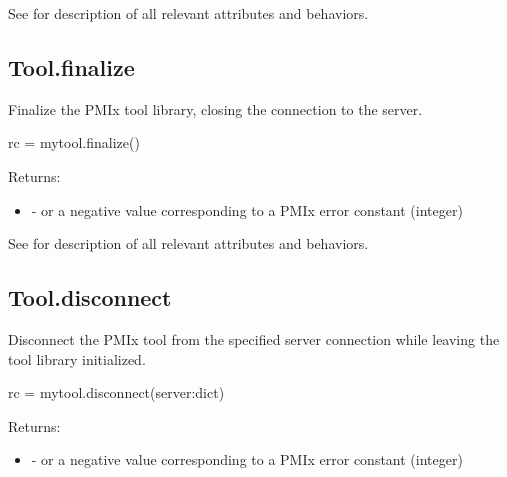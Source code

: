 See  for description of all relevant attributes and behaviors.


\subsection{Tool.finalize}

\summary

Finalize the PMIx tool library, closing the connection to the server.

\format

\pyspecificstart
\begin{codepar}
rc = mytool.finalize()
\end{codepar}
\pyspecificend


Returns:

\begin{itemize}
    \item {} -  or a negative value corresponding to a PMIx error constant (integer)
\end{itemize}


See  for description of all relevant attributes and behaviors.


\subsection{Tool.disconnect}

\summary

Disconnect the \ac{PMIx} tool from the specified server connection while leaving the tool library initialized.

\format

\pyspecificstart
\begin{codepar}
rc = mytool.disconnect(server:dict)
\end{codepar}
\pyspecificend

\begin{arglist}
\end{arglist}

Returns:

\begin{itemize}
    \item {} -  or a negative value corresponding to a PMIx error constant (integer)
\end{itemize}

